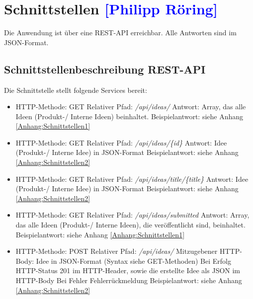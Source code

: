 

\section{Schnittstellen \textcolor{blue}{[Philipp Röring]}}

Die Anwendung ist über eine REST-API erreichbar. Alle Antworten sind im JSON-Format.

\subsection{Schnittstellenbeschreibung REST-API}
Die Schnittstelle stellt folgende Services bereit:
\begin{itemize}
    \item HTTP-Methode: GET
    \subitem Relativer Pfad: \textit{/api/ideas/}
    \subitem Antwort: Array, das alle Ideen (Produkt-/ Interne Ideen) beinhaltet.
    \subitem Beispielantwort: siehe Anhang \ref{Anhang:Schnittstellen1}
\end{itemize}

\begin{itemize}
    \item HTTP-Methode: GET
    \subitem Relativer Pfad: \textit{/api/ideas/\{id\}}
    \subitem Antwort: Idee (Produkt-/ Interne Idee) in JSON-Format
    \subitem Beispielantwort: siehe Anhang \ref{Anhang:Schnittstellen2}
\end{itemize}

\begin{itemize}
    \item HTTP-Methode: GET
    \subitem Relativer Pfad: \textit{/api/ideas/title/\{title\}}
    \subitem Antwort: Idee (Produkt-/ Interne Idee) in JSON-Format
    \subitem Beispielantwort: siehe Anhang \ref{Anhang:Schnittstellen2}
\end{itemize}

\begin{itemize}
    \item HTTP-Methode: GET
    \subitem Relativer Pfad: \textit{/api/ideas/submitted}
    \subitem Antwort: Array, das alle Ideen (Produkt-/ Interne Ideen), die veröffentlicht sind, beinhaltet.
    \subitem Beispielantwort: siehe Anhang \ref{Anhang:Schnittstellen1}
\end{itemize}

\begin{itemize}
    \item HTTP-Methode: POST
    \subitem Relativer Pfad: \textit{/api/ideas/}
    \subitem Mitzugebener HTTP-Body: Idee in JSON-Format (Syntax siehe GET-Methoden)
    \subitem Bei Erfolg
    \subsubitem HTTP-Status 201 im HTTP-Header, sowie die erstellte Idee als JSON im HTTP-Body
    \subitem Bei Fehler
    \subsubitem Fehlerrückmeldung
    \subitem Beispielantwort: siehe Anhang \ref{Anhang:Schnittstellen2}
\end{itemize}

